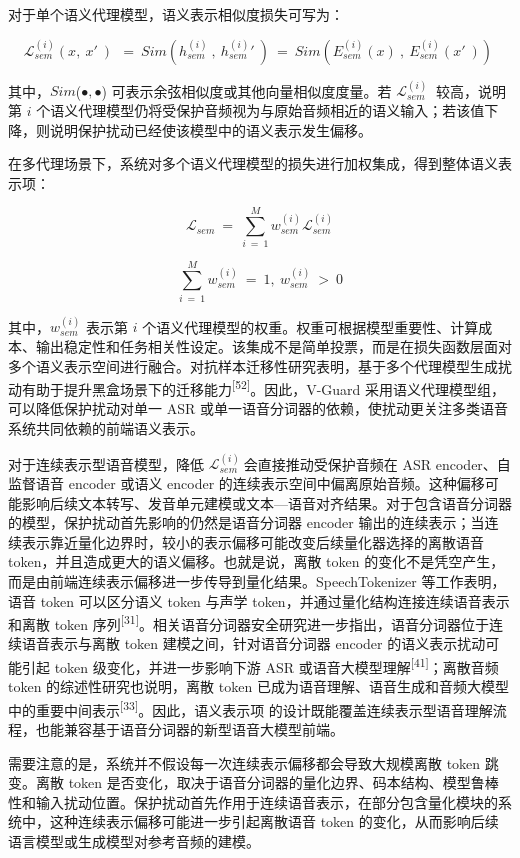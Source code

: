 对于单个语义代理模型，语义表示相似度损失可写为：

\[\mathcal{L}_{sem}^{(i)}(x,\ x'\ )\ \  = \ Sim(h_{sem}^{(i)}\ ,\ {h_{sem}^{(i)}}'\ )\  = \ Sim(E_{sem}^{(i)}(x)\ ,\ E_{sem}^{(i)}(x'\ ))\ \]

其中，\(Sim\)(\(\bullet , \bullet\))
可表示余弦相似度或其他向量相似度度量。若 \(\mathcal{L}_{sem}^{(i)}\ \)
较高，说明第 \(i\)
个语义代理模型仍将受保护音频视为与原始音频相近的语义输入；若该值下降，则说明保护扰动已经使该模型中的语义表示发生偏移。

在多代理场景下，系统对多个语义代理模型的损失进行加权集成，得到整体语义表示项：

\[\mathcal{L}_{sem}\  = \ \sum_{i\  = \ 1}^{M}{w_{sem}^{(i)}\mathcal{L}_{sem}^{(i)}}\]

\[\sum_{i\  = \ 1}^{M}w_{sem}^{(i)}\  = \ 1,\ w_{sem}^{(i)}\  > \ 0\]

其中，\(w_{sem}^{(i)}\) 表示第 \(i\)
个语义代理模型的权重。权重可根据模型重要性、计算成本、输出稳定性和任务相关性设定。该集成不是简单投票，而是在损失函数层面对多个语义表示空间进行融合。对抗样本迁移性研究表明，基于多个代理模型生成扰动有助于提升黑盒场景下的迁移能力\textsuperscript{{[}52{]}}。因此，V-Guard
采用语义代理模型组，可以降低保护扰动对单一 ASR
或单一语音分词器的依赖，使扰动更关注多类语音系统共同依赖的前端语义表示。

对于连续表示型语音模型，降低 \(\mathcal{L}_{sem}^{(i)}\ \)会直接推动受保护音频在
ASR encoder、自监督语音 encoder 或语义 encoder
的连续表示空间中偏离原始音频。这种偏移可能影响后续文本转写、发音单元建模或文本---语音对齐结果。对于包含语音分词器的模型，保护扰动首先影响的仍然是语音分词器
encoder
输出的连续表示；当连续表示靠近量化边界时，较小的表示偏移可能改变后续量化器选择的离散语音
token，并且造成更大的语义偏移。也就是说，离散 token
的变化不是凭空产生，而是由前端连续表示偏移进一步传导到量化结果。SpeechTokenizer
等工作表明，语音 token 可以区分语义 token 与声学
token，并通过量化结构连接连续语音表示和离散 token
序列\textsuperscript{{[}31{]}}。相关语音分词器安全研究进一步指出，语音分词器位于连续语音表示与离散
token 建模之间，针对语音分词器 encoder 的语义表示扰动可能引起 token
级变化，并进一步影响下游 ASR
或语音大模型理解\textsuperscript{{[}41{]}}；离散音频 token
的综述性研究也说明，离散 token
已成为语音理解、语音生成和音频大模型中的重要中间表示\textsuperscript{{[}33{]}}。因此，语义表示项
的设计既能覆盖连续表示型语音理解流程，也能兼容基于语音分词器的新型语音大模型前端。

需要注意的是，系统并不假设每一次连续表示偏移都会导致大规模离散 token
跳变。离散 token
是否变化，取决于语音分词器的量化边界、码本结构、模型鲁棒性和输入扰动位置。保护扰动首先作用于连续语音表示，在部分包含量化模块的系统中，这种连续表示偏移可能进一步引起离散语音
token 的变化，从而影响后续语言模型或生成模型对参考音频的建模。

